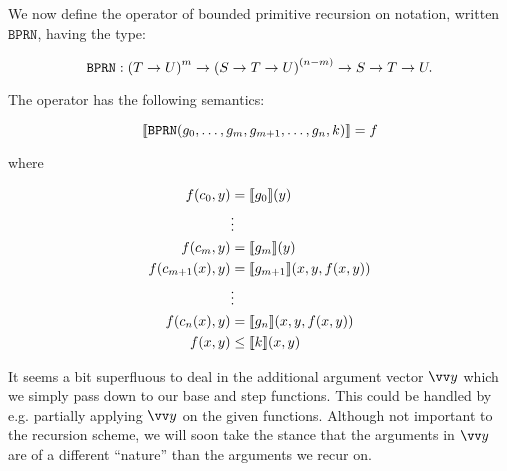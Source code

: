 We now define the operator of bounded primitive recursion on notation, written
$\mathtt{BPRN}$, having the type:

$$\mathtt{BPRN} : \p{T \rightarrow U}^m \rightarrow \p{S \rightarrow T
\rightarrow U}^\p{n-m} \rightarrow S \rightarrow T \rightarrow U.$$

The operator has the following semantics:

$$\sem{\mathtt{BPRN}\p{g_0, \ldots, g_m, g_{m+1}, \ldots, g_n, k}} = f$$

where

\begin{align*}
f\p{c_0,y} &= \sem{g_0}\p{y} \\
          & \vdots \\
f\p{c_m,y} &= \sem{g_m}\p{y} \\
f\p{c_{m+1}\p{x},y} &= \sem{g_{m+1}}\p{x,y,f\p{x,y}} \\
          & \vdots \\
f\p{c_n\p{x},y} &= \sem{g_n}\p{x,y,f\p{x,y}} \\
f\p{x,y} &\leq \sem{k}\p{x,y}
\end{align*}



\begin{remark} It seems a bit superfluous to deal in the additional argument
vector $\vect{y}$ which we simply pass down to our base and step functions.
This could be handled by e.g. partially applying $\vect{y}$ on the given
functions.  Although not important to the recursion scheme, we will soon take
the stance that the arguments in $\vect{y}$ are of a different ``nature'' than
the arguments we recur on.\end{remark}




